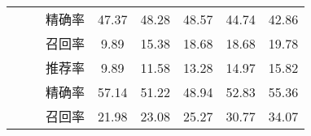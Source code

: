 \begin{table}
\begin{tabular}{cccccccc}
&  &精确率 & 47.37 & 48.28 & 48.57 & 44.74 & 42.86 \\
&  &召回率 & 9.89  & 15.38 & 18.68 & 18.68 & 19.78 \\
\cline{2-8}
&~\multirow{3}{*}{无演化属性(\%)}    
& 推荐率 & 9.89  & 11.58 & 13.28 & 14.97 & 15.82 \\
&  &精确率 & 57.14 & 51.22 & 48.94 & 52.83 & 55.36 \\
&  &召回率 & 21.98 & 23.08 & 25.27 & 30.77 & 34.07\\
\bottomrule[1.5pt]
\end{tabular}
\end{table} 

